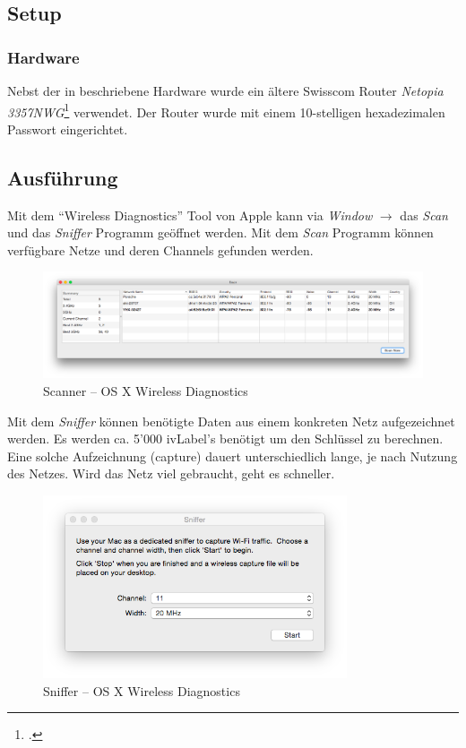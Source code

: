\subsection{Setup}
\subsubsection{Hardware}
Nebst der in  beschriebene Hardware wurde ein ältere Swisscom Router \textit{Netopia  3357NWG}\footcite{Netopia_3347_57nwg_de_2015-04-06} verwendet. Der Router wurde mit einem 10-stelligen hexadezimalen Passwort eingerichtet.

\subsection{Ausführung}
\label{subsec:wep_crack_tutorial}
Mit dem "`Wireless Diagnostics"' Tool von Apple kann via \textit{Window} $\rightarrow$ das \textit{Scan} und das \textit{Sniffer} Programm geöffnet werden.
Mit dem \textit{Scan} Programm können verfügbare Netze und deren Channels gefunden werden.

\begin{figure}[H]
	\centering
	\includegraphics[width=1.0\textwidth]{images/wep/scan.png}
	\caption{Scanner -- OS X Wireless Diagnostics}
\end{figure}

Mit dem \textit{Sniffer} können benötigte Daten aus einem konkreten Netz aufgezeichnet werden. Es werden ca. 5'000 \gls{ivLabel}'s benötigt um den Schlüssel zu berechnen. Eine solche Aufzeichnung (capture) dauert unterschiedlich lange, je nach Nutzung des Netzes. Wird das Netz viel gebraucht, geht es schneller.

\begin{figure}[H]
	\centering
	\includegraphics[width=0.8\textwidth]{images/wep/sniffer.png}
	\caption{Sniffer -- OS X Wireless Diagnostics}
\end{figure}

